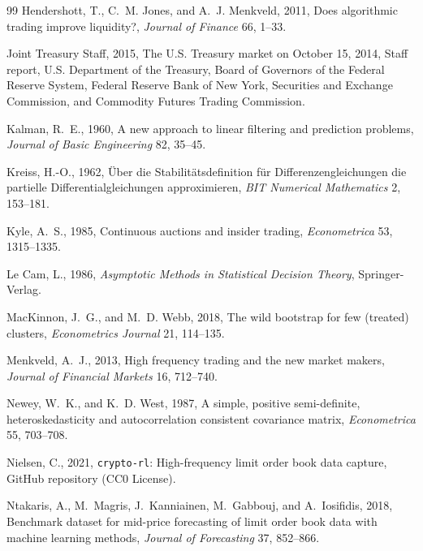 \documentclass[12pt]{article}
\theoremstyle{definition}
\theoremstyle{remark}
\begin{document}
\begin{thebibliography}{99}
Hendershott, T., C.~M. Jones, and A.~J. Menkveld, 2011, Does algorithmic trading improve liquidity?, \emph{Journal of Finance} 66, 1--33.

Joint Treasury Staff, 2015, The U.S. Treasury market on October 15, 2014, Staff report, U.S. Department of the Treasury, Board of Governors of the Federal Reserve System, Federal Reserve Bank of New York, Securities and Exchange Commission, and Commodity Futures Trading Commission.

Kalman, R.~E., 1960, A new approach to linear filtering and prediction problems, \emph{Journal of Basic Engineering} 82, 35--45.

Kreiss, H.-O., 1962, {\"U}ber die Stabilit{\"a}tsdefinition f{\"u}r Differenzengleichungen die partielle Differentialgleichungen approximieren, \emph{BIT Numerical Mathematics} 2, 153--181.

Kyle, A.~S., 1985, Continuous auctions and insider trading, \emph{Econometrica} 53, 1315--1335.

Le Cam, L., 1986, \emph{Asymptotic Methods in Statistical Decision Theory}, Springer-Verlag.

MacKinnon, J.~G., and M.~D. Webb, 2018, The wild bootstrap for few (treated) clusters, \emph{Econometrics Journal} 21, 114--135.

Menkveld, A.~J., 2013, High frequency trading and the new market makers, \emph{Journal of Financial Markets} 16, 712--740.

Newey, W.~K., and K.~D. West, 1987, A simple, positive semi-definite, heteroskedasticity and autocorrelation consistent covariance matrix, \emph{Econometrica} 55, 703--708.

Nielsen, C., 2021, \texttt{crypto-rl}: High-frequency limit order book data capture, GitHub repository (CC0 License).

Ntakaris, A., M.~Magris, J.~Kanniainen, M.~Gabbouj, and A.~Iosifidis, 2018, Benchmark dataset for mid-price forecasting of limit order book data with machine learning methods, \emph{Journal of Forecasting} 37, 852--866.


\end{thebibliography}
\end{document}
